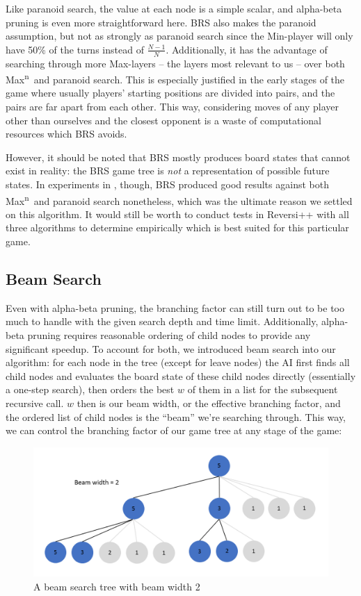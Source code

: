 \documentclass[a4paper,12pt]{article}
\newcommand{\Maxn}{Max\textsuperscript{n}\ }
\begin{document}
    Like paranoid search, the value at each node is a simple scalar, and alpha-beta pruning is even more straightforward here. BRS also makes the paranoid assumption, but not as strongly as paranoid search since the Min-player will only have 50\% of the turns instead of $\frac{N-1}{N}$. Additionally, it has the advantage of searching through more Max-layers -- the layers most relevant to us -- over both \Maxn and paranoid search. This is especially justified in the early stages of the game where usually players' starting positions are divided into pairs, and the pairs are far apart from each other. This way, considering moves of any player other than ourselves and the closest opponent is a waste of computational resources which BRS avoids.
    
    However, it should be noted that BRS mostly produces board states that cannot exist in reality: the BRS game tree is \emph{not} a representation of possible future states. In experiments in \cite{best-reply-search}, though, BRS produced good results against both \Maxn and paranoid search nonetheless, which was the ultimate reason we settled on this algorithm. It would still be worth to conduct tests in Reversi++ with all three algorithms to determine empirically which is best suited for this particular game.
    
    \subsection{Beam Search}
    Even with alpha-beta pruning, the branching factor can still turn out to be too much to handle with the given search depth and time limit. Additionally, alpha-beta pruning requires reasonable ordering of child nodes to provide any significant speedup. To account for both, we introduced beam search into our algorithm: for each node in the tree (except for leave nodes) the AI first finds all child nodes and evaluates the board state of these child nodes directly (essentially a one-step search), then orders the best $w$ of them in a list for the subsequent recursive call. $w$ then is our beam width, or the effective branching factor, and the ordered list of child nodes is the ``beam'' we're searching through. This way, we can control the branching factor of our game tree at any stage of the game:
    
    \begin{figure}[H]
        \centering
        \includegraphics[width=\textwidth,keepaspectratio]{pictures/assignment3/BeamSearch.png}
        \caption{A beam search tree with beam width 2}
    \end{figure}
    
\end{document}
